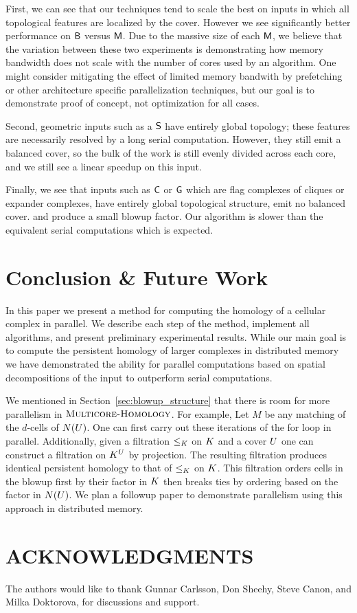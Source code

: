 \documentclass{jocg}
\begin{document}
First, we can see that our techniques tend to scale the best on inputs
in which all topological features are localized by the cover. However we see significantly 
better performance on ${\textsf{B}}$ versus $\textsf{M}$. Due to the massive size
of each $\textsf{M}$, we believe that the variation between these two experiments is 
demonstrating how memory bandwidth does not scale with the number
of cores used by an algorithm. One might consider mitigating the effect of limited memory 
bandwith by prefetching or other architecture specific parallelization
techniques, but our goal is to demonstrate proof of concept, not optimization for all cases.

Second, geometric inputs such as a $\textsf{S}$ have entirely global topology; these
features are necessarily resolved by a long serial computation. However, they still
emit a balanced cover, so the bulk of the work is still evenly divided across each core,
and we still see a linear speedup on this input.
 
Finally, we see that inputs such as $\textsf{C}$ or $\textsf{G}$ which are flag complexes of cliques or
expander complexes, have entirely global topological structure,
emit no balanced cover. and produce a small blowup factor. 
Our algorithm is slower than the equivalent serial computations which
is expected.

\section{Conclusion \& Future Work}
In this paper we present a method for computing the homology of 
a cellular complex in parallel. We describe each step of the method,
implement all algorithms, and present preliminary experimental results.
While our main goal is to compute the persistent homology of larger complexes in 
distributed memory we have demonstrated the ability for parallel computations 
based on spatial decompositions of the input to outperform serial computations.

We mentioned in Section~\ref{sec:blowup_structure} that there is 
room for more parallelism in $\textnormal{\scshape Multicore-Homology}$. 
For example, Let $M$ be any matching of the $d$-cells of $N(U)$. 
One can first carry out these iterations of the for loop in parallel. 
Additionally, given a filtration $\leq_{K}$ on $K$ and a cover $U$
one can construct a filtration on $K^U$ by projection. The resulting
filtration produces identical persistent homology to that of $\leq_{K}$ on $K$.
This filtration orders cells in the blowup first by their factor in $K$ then
breaks ties by ordering based on the factor in $N(U)$. We plan a followup
paper to demonstrate parallelism using this approach in distributed memory.

\section*{ACKNOWLEDGMENTS}
The authors would like to thank  Gunnar Carlsson, Don Sheehy, Steve Canon, and 
Milka Doktorova, for discussions and support.
{ 
  \small 
  
   
}
\end{document}
